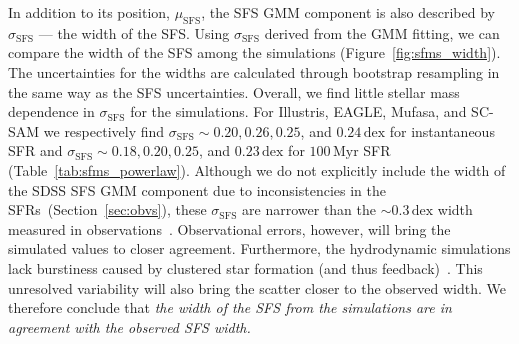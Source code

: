 \documentclass[tighten, preprint]{aastex62}
\begin{document}
In addition to its position, $\mu_\mathrm{SFS}$, the SFS GMM component 
is also described by $\sigma_\mathrm{SFS}$ --- the width of the SFS. 
Using $\sigma_\mathrm{SFS}$ derived from the GMM fitting, 
we can compare the width of the SFS among the simulations 
(Figure~\ref{fig:sfms_width}). The uncertainties for the widths are 
calculated through bootstrap resampling in the same way as the SFS 
uncertainties. Overall, we find little stellar mass 
dependence in $\sigma_\mathrm{SFS}$ for the simulations. For Illustris, 
EAGLE, {\sc Mufasa}, and SC-SAM we respectively find 
$\sigma_\mathrm{SFS}{\sim}0.20, 0.26, 0.25$, and $0.24\,\mathrm{dex}$ 
for instantaneous SFR and
$\sigma_\mathrm{SFS}{\sim}0.18, 0.20, 0.25$, and $0.23\,\mathrm{dex}$
for $100\,\mathrm{Myr}$ SFR (Table~\ref{tab:sfms_powerlaw}). Although 
we do not explicitly include the width of the SDSS SFS GMM component 
due to inconsistencies in the SFRs~(Section~\ref{sec:obvs}), these $\sigma_\mathrm{SFS}$ 
are narrower than the ${\sim}0.3\,\mathrm{dex}$ width measured in 
observations~\citep[\emph{e.g.}][]{daddi2007, noeske2007, salim2007, magdis2012, whitaker2012, speagle2014}. 
Observational errors, however, will bring the simulated values to closer 
agreement. Furthermore, the hydrodynamic simulations lack burstiness caused by 
clustered star formation (and thus feedback)~\citep{sparre2017a}. 
This unresolved variability will also bring the scatter closer to 
the observed width. %
We therefore conclude that \emph{the width of the SFS from the simulations 
are in agreement with the observed SFS width.}
\end{document}
